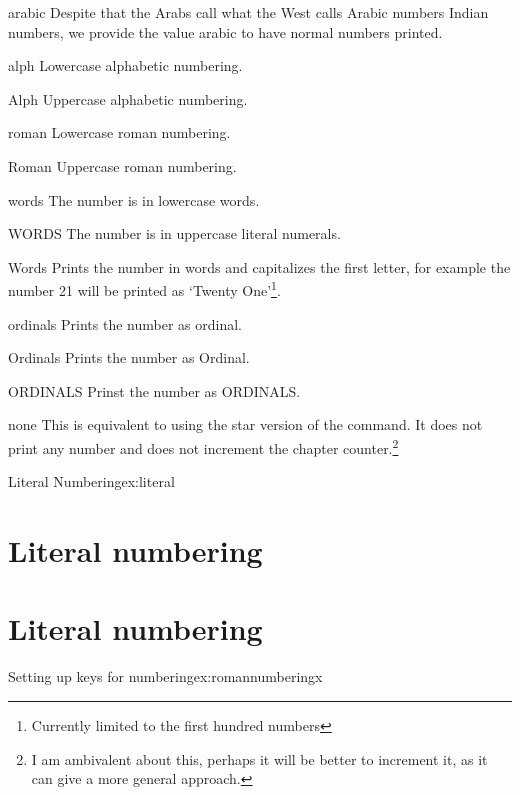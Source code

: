 \begin{decription}
{\begin{marglist}
\item [arabic] Despite that the Arabs call what the West calls Arabic numbers Indian numbers, we provide the value arabic to have normal numbers printed.
\item [alph] Lowercase alphabetic numbering.
\item [Alph] Uppercase alphabetic numbering.
\item [roman] Lowercase roman numbering.
\item [Roman] Uppercase roman numbering.
\item [words] The number is in lowercase words.
\item [WORDS] The number is in uppercase literal numerals.
\item [Words] Prints the number in words and capitalizes the first letter, for example the number 21 will be printed as `Twenty One'\footnote{Currently limited to the first hundred numbers}.
\item [ordinals] Prints the number as ordinal.
\item [Ordinals] Prints the number as Ordinal.
\item [ORDINALS] Prinst the number as ORDINALS.
\item [none] This is equivalent to using the star version of the command. It does not print any number and does not increment the chapter counter.\footnote{I am ambivalent about this, perhaps it will be better to increment it, as it can give a more general approach.}

\end{marglist}
\begin{texexample}{Literal Numbering}{ex:literal}
\chapter{Literal numbering}
\lorem
{}
\chapter{Literal numbering} 
\lorem
\end{texexample}





\begin{texexample}{Setting up keys for numbering}{ex:romannumberingx}
\bgroup
{}

\end{texexample}}
\end{decription}
